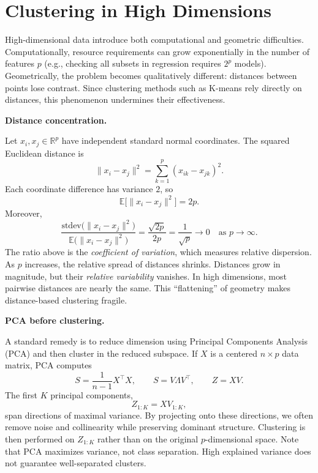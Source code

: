 \section{Clustering in High Dimensions}

\medskip

High-dimensional data introduce both computational and geometric difficulties. 
Computationally, resource requirements can grow exponentially in the number of features $p$ (e.g., checking all subsets in regression requires $2^p$ models). Geometrically, the problem becomes qualitatively different: distances between points lose contrast. Since clustering methods such as K-means rely directly on distances, this phenomenon undermines their effectiveness.

\medskip

\textbf{Distance concentration.}

Let $x_i, x_j \in \mathbb{R}^p$ have independent standard normal coordinates. The squared Euclidean distance is
\[
\|x_i - x_j\|^2 = \sum_{k=1}^p (x_{ik} - x_{jk})^2.
\]
Each coordinate difference has variance $2$, so
\[
\mathbb{E}\big[\|x_i - x_j\|^2\big] = 2p.
\]
Moreover,
\[
\frac{\text{stdev}\big(\|x_i - x_j\|^2\big)}{\mathbb{E}\big(\|x_i - x_j\|^2\big)} 
= \frac{\sqrt{2p}}{2p}
= \frac{1}{\sqrt{p}}
\to 0 \quad \text{as } p \to \infty.
\]
The ratio above is the \emph{coefficient of variation}, which measures relative dispersion. 
As $p$ increases, the relative spread of distances shrinks. Distances grow in magnitude, but their \emph{relative variability} vanishes. In high dimensions, most pairwise distances are nearly the same. This “flattening” of geometry makes distance-based clustering fragile.

\medskip

\textbf{PCA before clustering.}

A standard remedy is to reduce dimension using Principal Components Analysis (PCA) and then cluster in the reduced subspace. If $X$ is a centered $n \times p$ data matrix, PCA computes
\[
S = \frac{1}{n-1} X^\top X, \qquad
S = V \Lambda V^\top, \qquad
Z = XV.
\]
The first $K$ principal components,
\[
Z_{1:K} = X V_{1:K},
\]
span directions of maximal variance. By projecting onto these directions, we often remove noise and collinearity while preserving dominant structure. Clustering is then performed on $Z_{1:K}$ rather than on the original $p$-dimensional space. Note that PCA maximizes variance, not class separation. High explained variance does not guarantee well-separated clusters.

